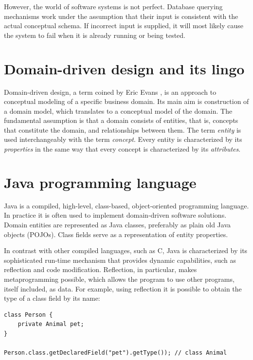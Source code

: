 \n

However, the world of software systems is not perfect. Database querying mechanisms work under the assumption that their input is consistent with the actual conceptual schema. If incorrect input is supplied, it will most likely cause the system to fail when it is already running or being tested.

\section{Domain-driven design and its lingo}

Domain-driven design, a term coined by Eric Evans \cite{ddd}, is an approach to conceptual modeling of a specific business domain.
Its main aim is construction of a domain model, which translates to a conceptual model of the domain.
The fundamental assumption is that a domain consists of entities, that is, concepts that constitute the domain, and relationships between them. 
The term \textit{entity} is used interchangeably with the term \textit{concept}. Every entity is characterized by its \textit{properties} in the same way that every concept is characterized by its \textit{attributes}.

\section{Java programming language}
Java is a compiled, high-level, class-based, object-oriented programming language. In practice it is often used to implement domain-driven software solutions. Domain entities are represented as Java classes, preferably as plain old Java objects (POJOs). Class fields serve as a representation of entity properties.

\n

In contrast with other compiled languages, such as C, Java is characterized by its sophisticated run-time mechanism that provides dynamic capabilities, such as reflection and code modification. Reflection, in particular, makes metaprogramming possible, which allows the program to use other programs, itself included, as data. For example, using reflection it is possible to obtain the type of a class field by its name:

\begin{verbatim}
class Person {
    private Animal pet;
}

Person.class.getDeclaredField("pet").getType()); // class Animal
\end{verbatim}

